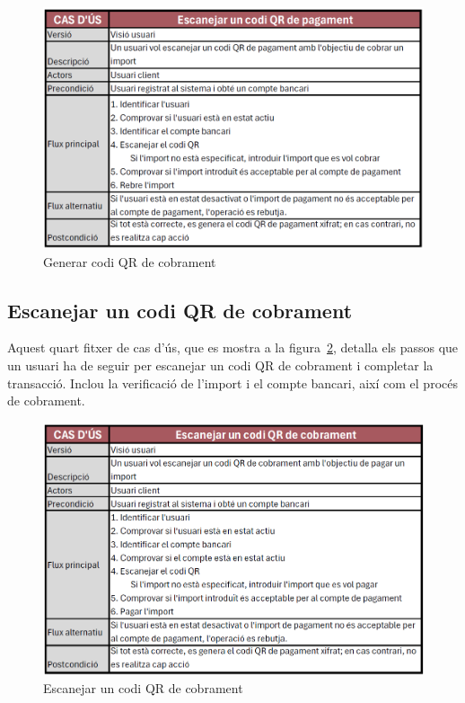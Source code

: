 \documentclass[a4paper,12pt,twoside]{ThesisStyle}
\begin{document}
\begin{figure}[h]
    \centering
    \includegraphics[width=1\textwidth]{imatges/f3.png}
    \caption{Generar codi QR de cobrament}
    \label{fig:Escanejar un codi QR de pagament}
\end{figure}

\clearpage


\subsection{Escanejar un codi QR de cobrament}
\label{subsec:Escanejar un codi QR de cobrament}

Aquest quart fitxer de cas d'ús, que es mostra a la figura~\ref{fig:Escanejar un codi QR de cobrament}, detalla els passos que un usuari ha de seguir per escanejar un codi QR de cobrament i completar la transacció. Inclou la verificació de l’import i el compte bancari, així com el procés de cobrament.

\begin{figure}[h]
    \centering
    \includegraphics[width=1\textwidth]{imatges/f4.png}
    \caption{Escanejar un codi QR de cobrament}
    \label{fig:Escanejar un codi QR de cobrament}
\end{figure}
\end{document}
